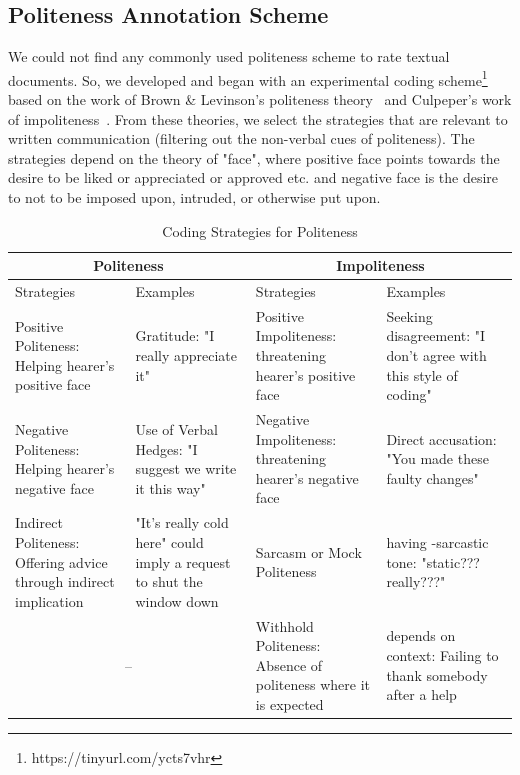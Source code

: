 \subsection{Politeness Annotation Scheme}\label{polscheme}

We could not find any commonly used politeness scheme to rate textual documents. So, we developed and began with an experimental coding scheme\footnote{https://tinyurl.com/ycts7vhr} based on the work of Brown \& Levinson's politeness theory~\cite{brown1987politeness} and Culpeper's work of impoliteness~\cite{culpeper1996towards}. From these theories, we select the strategies that are relevant to written communication (filtering out the non-verbal cues of politeness). The strategies depend on the theory of "face", where positive face points towards the desire to be liked or appreciated or approved etc. and negative face is the desire to not to be imposed upon, intruded, or otherwise put upon.

\FloatBarrier
\begin{table}[H]
	\centering
	\caption{Coding Strategies for Politeness}
	\label{poltable}
	\begin{tabular}{ | m{1.5cm} | m{2cm}|| m{1.5cm} | m{2cm} | }
		\hline
		\multicolumn{2}{|c||}{Politeness} & \multicolumn{2}{c|}{Impoliteness} \\
		\hline
		Strategies & Examples & Strategies & Examples \\ 
		\hline
		Positive Politeness: Helping hearer's positive face  & Gratitude: "I really appreciate it" & Positive Impoliteness: threatening hearer's positive face & Seeking disagreement: "I don't agree with this style of coding" \\
		\hline
		Negative Politeness: Helping hearer's negative face & Use of Verbal Hedges: "I suggest we write it this way" & Negative Impoliteness: threatening hearer's negative face  & Direct accusation: "You made these faulty changes"\\
		\hline
		Indirect Politeness: Offering advice through indirect implication & "It's really cold here" could imply a request to shut the window down & Sarcasm or Mock Politeness & having -sarcastic tone: "static??? really???" \\
		\hline
		\multicolumn{2}{c|}{--} & Withhold Politeness\tablefootnote{Excluded in the modified scheme after the experiment}: Absence of politeness where it is expected & depends on context: Failing to thank somebody after a help\\
		\cline{3-4}
	\end{tabular}
\end{table}

